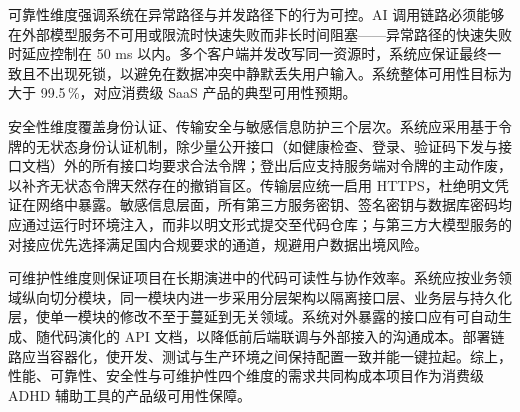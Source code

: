 \par 可靠性维度强调系统在异常路径与并发路径下的行为可控。AI 调用链路必须能够在外部模型服务不可用或限流时快速失败而非长时间阻塞——异常路径的快速失败时延应控制在 50 ms 以内。多个客户端并发改写同一资源时，系统应保证最终一致且不出现死锁，以避免在数据冲突中静默丢失用户输入。系统整体可用性目标为大于 99.5\,\%，对应消费级 SaaS 产品的典型可用性预期。

\par 安全性维度覆盖身份认证、传输安全与敏感信息防护三个层次。系统应采用基于令牌的无状态身份认证机制，除少量公开接口（如健康检查、登录、验证码下发与接口文档）外的所有接口均要求合法令牌；登出后应支持服务端对令牌的主动作废，以补齐无状态令牌天然存在的撤销盲区。传输层应统一启用 HTTPS，杜绝明文凭证在网络中暴露。敏感信息层面，所有第三方服务密钥、签名密钥与数据库密码均应通过运行时环境注入，而非以明文形式提交至代码仓库；与第三方大模型服务的对接应优先选择满足国内合规要求的通道，规避用户数据出境风险。

\par 可维护性维度则保证项目在长期演进中的代码可读性与协作效率。系统应按业务领域纵向切分模块，同一模块内进一步采用分层架构以隔离接口层、业务层与持久化层，使单一模块的修改不至于蔓延到无关领域。系统对外暴露的接口应有可自动生成、随代码演化的 API 文档，以降低前后端联调与外部接入的沟通成本。部署链路应当容器化，使开发、测试与生产环境之间保持配置一致并能一键拉起。综上，性能、可靠性、安全性与可维护性四个维度的需求共同构成本项目作为消费级 ADHD 辅助工具的产品级可用性保障。

